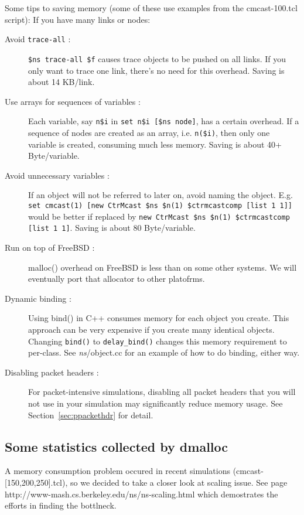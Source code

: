 Some tips to saving memory (some of these use examples from the 
cmcast-100.tcl script): 
If you have many links or nodes: 
\begin{description}
\item[Avoid {\tt trace-all} :]
{\tt \$ns trace-all \$f} causes trace objects to be pushed on all links. If 
you only want to trace one link, there's no need for this overhead. Saving
is about 14 KB/link. 

\item[Use arrays for sequences of variables :]
Each variable, say {\tt n\$i} in {\tt set n\$i [\$ns node]}, has a certain
overhead. If a sequence of nodes are created as an array, i.e.
{\tt n(\$i)}, then only one variable is created, consuming much less
memory. Saving is about 40+ Byte/variable. 

\item[Avoid unnecessary variables :]
If an object will not be referred to later on, avoid naming the object.
E.g.
{\tt set cmcast(1) [new CtrMcast \$ns \$n(1) \$ctrmcastcomp [list 1 1]]}
would be better if replaced by
{\tt new CtrMcast \$ns \$n(1) \$ctrmcastcomp [list 1 1]}.
Saving is about 80 Byte/variable. 

\item[Run on top of FreeBSD :]
malloc() overhead on FreeBSD is less than on some other systems. We will
eventually port that allocator to other platofrms. 

\item[Dynamic binding :]
Using bind() in C++ consumes memory for each object you create. This
approach can be very expensive if you create many identical objects.
Changing {\tt bind()} to {\tt delay\_bind()} changes this memory
requirement to per-class. See \emph{ns}/object.cc for an example of how to do
binding, either way.

\item[Disabling packet headers :]
For packet-intensive simulations, disabling all packet headers that
you will not use in your simulation may significantly reduce memory
usage. See Section~\ref{sec:ppackethdr} for detail.
 
\end{description}


\subsection{Some statistics collected by dmalloc}
\label{sec:statdmalloc}

A memory consumption problem occured in recent simulations 
(cmcast-[150,200,250].tcl), so we decided to take a closer look at scaling
issue. See page http://www-mash.cs.berkeley.edu/ns/ns-scaling.html
which demostrates the efforts in finding the bottlneck. 
 

